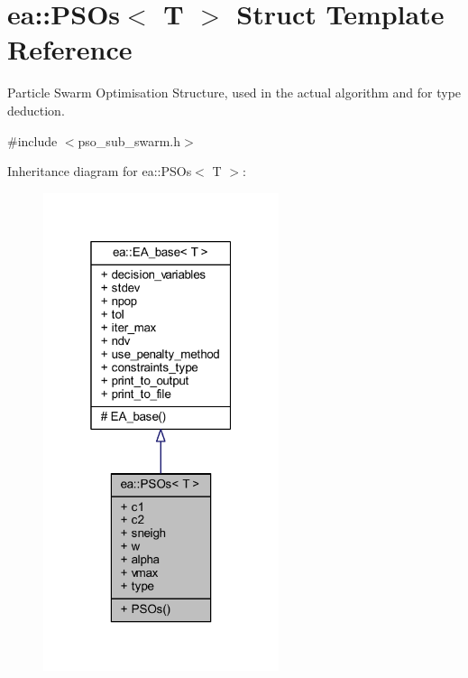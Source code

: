 \hypertarget{structea_1_1_p_s_os}{}\section{ea\+:\+:P\+S\+Os$<$ T $>$ Struct Template Reference}
\label{structea_1_1_p_s_os}


Particle Swarm Optimisation Structure, used in the actual algorithm and for type deduction.  




{\ttfamily \#include $<$pso\+\_\+sub\+\_\+swarm.\+h$>$}



Inheritance diagram for ea\+:\+:P\+S\+Os$<$ T $>$\+:
\nopagebreak
\begin{figure}[H]
\begin{center}
\leavevmode
\includegraphics[width=196pt]{structea_1_1_p_s_os__inherit__graph}
\end{center}
\end{figure}
